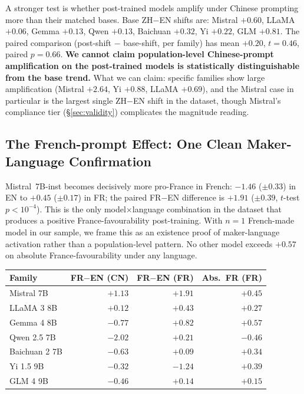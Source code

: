\documentclass[letterpaper]{article} %
\begin{document}
A stronger test is whether post-trained models amplify under Chinese prompting more than their matched bases. Base ZH$-$EN shifts are: Mistral $+0.60$, LLaMA $+0.06$, Gemma $+0.13$, Qwen $+0.13$, Baichuan $+0.32$, Yi $+0.22$, GLM $+0.81$. The paired comparison (post-shift $-$ base-shift, per family) has mean $+0.20$, $t = 0.46$, paired $p = 0.66$. \textbf{We cannot claim population-level Chinese-prompt amplification on the post-trained models is statistically distinguishable from the base trend.} What we can claim: specific families show large amplification (Mistral $+2.64$, Yi $+0.88$, LLaMA $+0.69$), and the Mistral case in particular is the largest single ZH$-$EN shift in the dataset, though Mistral's compliance tier (\S\ref{sec:validity}) complicates the magnitude reading.

\subsection{The French-prompt Effect: One Clean Maker-Language Confirmation}

Mistral~7B-inst becomes decisively more pro-France in French: $-1.46$ ($\pm 0.33$) in EN to $+0.45$ ($\pm 0.17$) in FR; the paired FR$-$EN difference is $+1.91$ ($\pm 0.39$, $t$-test $p < 10^{-4}$). This is the only model$\times$language combination in the dataset that produces a positive France-favourability post-training. With $n = 1$ French-made model in our sample, we frame this as an existence proof of maker-language activation rather than a population-level pattern. No other model exceeds $+0.57$ on absolute France-favourability under any language.

\begin{center}
\small
\begin{tabular}{@{}l r r r@{}}
\toprule
Family & FR$-$EN (CN) & FR$-$EN (FR) & Abs.\ FR (FR) \\
\midrule
Mistral 7B    & $+1.13$ & $\mathbf{+1.91}$ & $\mathbf{+0.45}$ \\
LLaMA 3 8B    & $+0.12$ & $+0.43$          & $+0.27$ \\
Gemma 4 8B    & $-0.77$ & $+0.82$          & $+0.57$ \\
Qwen 2.5 7B   & $-2.02$ & $+0.21$          & $-0.46$ \\
Baichuan 2 7B & $-0.63$ & $+0.09$          & $+0.34$ \\
Yi 1.5 9B     & $-0.32$ & $-1.24$          & $+0.39$ \\
GLM 4 9B      & $-0.46$ & $+0.14$          & $+0.15$ \\
\bottomrule
\end{tabular}
\end{center}
\end{document}
